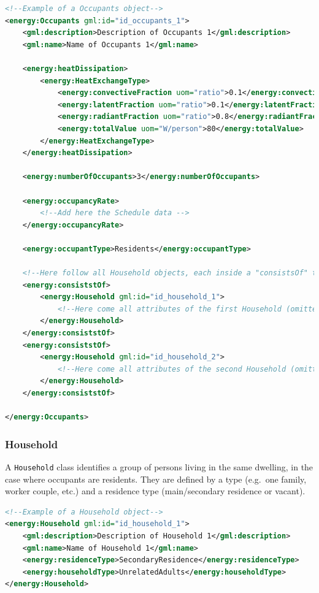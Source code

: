 \documentclass[a4paper,12pt]{article}
\begin{document}
\begin{lstlisting}[language=XML]
<!--Example of a Occupants object-->
<energy:Occupants gml:id="id_occupants_1">
    <gml:description>Description of Occupants 1</gml:description>
    <gml:name>Name of Occupants 1</gml:name>

    <energy:heatDissipation>
        <energy:HeatExchangeType>
            <energy:convectiveFraction uom="ratio">0.1</energy:convectiveFraction>
            <energy:latentFraction uom="ratio">0.1</energy:latentFraction>
            <energy:radiantFraction uom="ratio">0.8</energy:radiantFraction>
            <energy:totalValue uom="W/person">80</energy:totalValue>
        </energy:HeatExchangeType>
    </energy:heatDissipation>

    <energy:numberOfOccupants>3</energy:numberOfOccupants>

    <energy:occupancyRate>
        <!--Add here the Schedule data -->
    </energy:occupancyRate>

    <energy:occupantType>Residents</energy:occupantType>

    <!--Here follow all Household objects, each inside a "consistsOf" tag-->
    <energy:consiststOf>
        <energy:Household gml:id="id_household_1">
            <!--Here come all attributes of the first Household (omitted here)-->
        </energy:Household>
    </energy:consiststOf>
    <energy:consiststOf>
        <energy:Household gml:id="id_household_2">
            <!--Here come all attributes of the second Household (omitted here)-->
        </energy:Household>
    </energy:consiststOf>

</energy:Occupants>
\end{lstlisting}

\subsubsection{Household}\label{household}

A \lstinline!Household! class identifies a group of persons living in
the same dwelling, in the case where occupants are residents. They are
defined by a type (e.g.~one family, worker couple, etc.) and a residence
type (main/secondary residence or vacant).

\begin{lstlisting}[language=XML]
<!--Example of a Household object-->
<energy:Household gml:id="id_household_1">
    <gml:description>Description of Household 1</gml:description>
    <gml:name>Name of Household 1</gml:name>
    <energy:residenceType>SecondaryResidence</energy:residenceType>
    <energy:householdType>UnrelatedAdults</energy:householdType>
</energy:Household>
\end{lstlisting}
\end{document}
